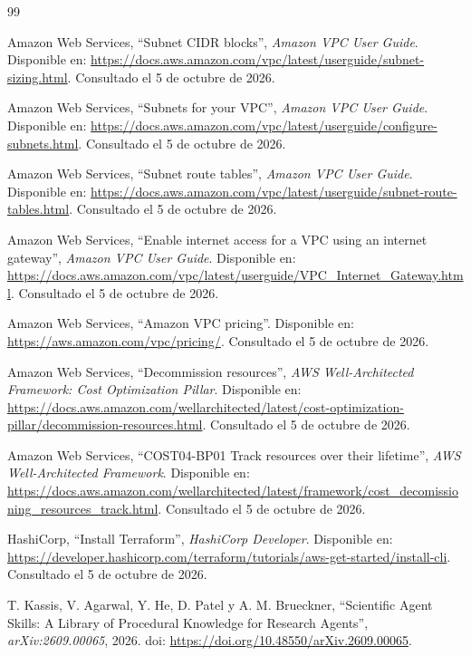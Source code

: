 \begin{thebibliography}{99}

Amazon Web Services, ``Subnet CIDR blocks'', \emph{Amazon VPC User Guide}. Disponible en: \url{https://docs.aws.amazon.com/vpc/latest/userguide/subnet-sizing.html}. Consultado el 5 de octubre de 2026.

Amazon Web Services, ``Subnets for your VPC'', \emph{Amazon VPC User Guide}. Disponible en: \url{https://docs.aws.amazon.com/vpc/latest/userguide/configure-subnets.html}. Consultado el 5 de octubre de 2026.

Amazon Web Services, ``Subnet route tables'', \emph{Amazon VPC User Guide}. Disponible en: \url{https://docs.aws.amazon.com/vpc/latest/userguide/subnet-route-tables.html}. Consultado el 5 de octubre de 2026.

Amazon Web Services, ``Enable internet access for a VPC using an internet gateway'', \emph{Amazon VPC User Guide}. Disponible en: \url{https://docs.aws.amazon.com/vpc/latest/userguide/VPC_Internet_Gateway.html}. Consultado el 5 de octubre de 2026.

Amazon Web Services, ``Amazon VPC pricing''. Disponible en: \url{https://aws.amazon.com/vpc/pricing/}. Consultado el 5 de octubre de 2026.

Amazon Web Services, ``Decommission resources'', \emph{AWS Well-Architected Framework: Cost Optimization Pillar}. Disponible en: \url{https://docs.aws.amazon.com/wellarchitected/latest/cost-optimization-pillar/decommission-resources.html}. Consultado el 5 de octubre de 2026.

Amazon Web Services, ``COST04-BP01 Track resources over their lifetime'', \emph{AWS Well-Architected Framework}. Disponible en: \url{https://docs.aws.amazon.com/wellarchitected/latest/framework/cost_decomissioning_resources_track.html}. Consultado el 5 de octubre de 2026.

HashiCorp, ``Install Terraform'', \emph{HashiCorp Developer}. Disponible en: \url{https://developer.hashicorp.com/terraform/tutorials/aws-get-started/install-cli}. Consultado el 5 de octubre de 2026.

T. Kassis, V. Agarwal, Y. He, D. Patel y A. M. Brueckner, ``Scientific Agent Skills: A Library of Procedural Knowledge for Research Agents'', \emph{arXiv:2609.00065}, 2026. doi: \url{https://doi.org/10.48550/arXiv.2609.00065}.

\end{thebibliography}
